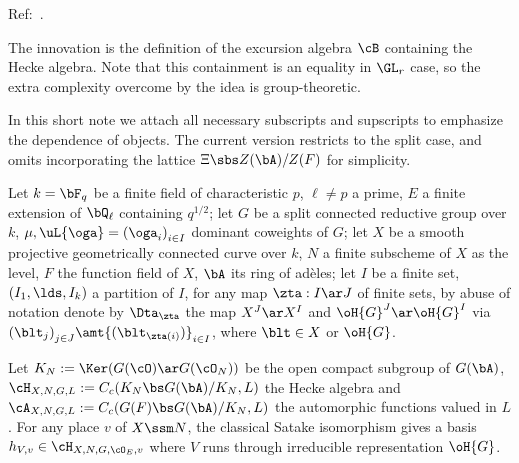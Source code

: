 \documentclass[article, a4paper, twoside]{universal}
\begin{document}
\confighead{}{}{}


Ref:~\cite{Lafforgue2018Chtoucas}.

The innovation is the definition of the excursion algebra $\cB$ containing the Hecke algebra. Note that this containment is an equality in $\GL_{r}$ case, so the extra complexity overcome by the idea is group-theoretic.

In this short note we attach all necessary subscripts and supscripts to emphasize the dependence of objects. The current version restricts to the split case, and omits incorporating the lattice $\Xi\sbs Z(\bA)/Z(F)$ for simplicity.


\begin{stp}
	Let $k=\bF_{q}$ be a finite field of characteristic $p$, $\ell\neq p$ a prime, $E$ a finite extension of $\bQ_{\ell}$ containing $q^{1/2}$; let $G$ be a split connected reductive group over $k$, $\mu,\uL{\oga}={(\oga_{i})}_{i\in I}$ dominant coweights of $G$; let $X$ be a smooth projective geometrically connected curve over $k$, $N$ a finite subscheme of $X$ as the level, $F$ the function field of $X$, $\bA$ its ring of ad{\`e}les; let $I$ be a finite set, $(I_{1},\lds,I_{k})$ a partition of $I$, for any map $\zta:I\ar J$ of finite sets, by abuse of notation denote by $\Dta_{\zta}$ the map $X^{J}\ar X^{I}$ and $\oH{G}^{J}\ar\oH{G}^{I}$ via ${(\blt_{j})}_{j\in J}\amt{(\blt_{\zta(i)})}_{i\in I}$, where $\blt\in X$ or $\oH{G}$.

	Let $K_{N}:=\Ker(G(\cO)\ar G(\cO_{N}))$ be the open compact subgroup of $G(\bA)$, $\cH_{X,N,G,L}:=C_{c}(K_{N}\bs G(\bA)/K_{N},L)$ the Hecke algebra and $\cA_{X,N,G,L}:=C_{c}(G(F)\bs G(\bA)/K_{N},L)$ the automorphic functions valued in $L$. For any place $v$ of $X\ssm N$, the classical Satake isomorphism gives a basis $h_{V,v}\in\cH_{X,N,G,\cO_{E},v}$ where $V$ runs through irreducible representation $\oH{G}$.


\end{stp}
\end{document}
